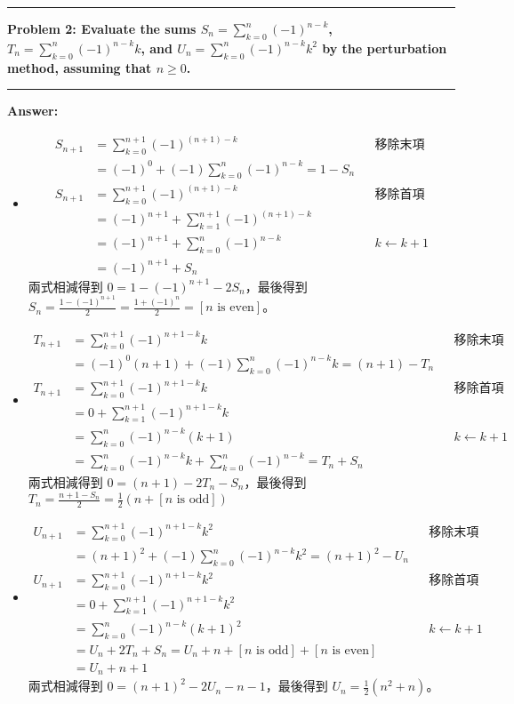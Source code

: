 \documentclass[11pt]{article}
\newcommand\question[2]{\vspace{.25in}\hrule\textbf{#1: #2}\vspace{.5em}\hrule\vspace{.10in}}
\renewcommand\part[1]{\vspace{.10in}\textbf{#1}}
\begin{document}
\question{Problem 2}{Evaluate the sums $S_n = \sum\nolimits_{k=0}^{n}(-1)^{n-k}$, $T_n = \sum\nolimits_{k=0}^{n}(-1)^{n-k} k$, and $U_n = \sum\nolimits_{k=0}^{n}(-1)^{n-k} k^2$ by the perturbation method, assuming that $n \ge 0$.
}

\part{Answer:}

\begin{itemize}
	\item 
		\begin{align*}
		S_{n+1} &= \sum_{k=0}^{n+1}(-1)^{(n+1)-k} && \text{移除末項}\\
				&= (-1)^0 + (-1)\sum_{k=0}^{n}(-1)^{n-k} = 1 - S_n \\
		S_{n+1} &= \sum_{k=0}^{n+1}(-1)^{(n+1)-k} && \text{移除首項}\\
				&= (-1)^{n+1} + \sum_{k=1}^{n+1}(-1)^{(n+1)-k} \\
				&= (-1)^{n+1} + \sum_{k=0}^{n}(-1)^{n-k} && k \leftarrow k+1 \\
				&= (-1)^{n+1} + S_n
		\end{align*}
		兩式相減得到 $0 = 1 - (-1)^{n+1} - 2 S_n$，最後得到 $S_n = \frac{1 - (-1)^{n+1}}{2} = \frac{1 + (-1)^n}{2} = [n \text{ is even}]$。
		
	\item 
		\begin{align*}
		T_{n+1} &= \sum_{k=0}^{n+1} (-1)^{n+1-k} k && \text{移除末項}\\
				&= (-1)^0(n+1) + (-1)\sum_{k=0}^{n} (-1)^{n-k} k = (n+1) - T_n \\
		T_{n+1} &= \sum_{k=0}^{n+1} (-1)^{n+1-k} k && \text{移除首項}\\
				&= 0 + \sum_{k=1}^{n+1} (-1)^{n+1-k} k \\
				&= \sum_{k=0}^{n} (-1)^{n-k} (k+1) && k \leftarrow k+1 \\
				&= \sum_{k=0}^{n} (-1)^{n-k} k + \sum_{k=0}^{n} (-1)^{n-k} = T_n + S_n
		\end{align*}
		兩式相減得到 $0 = (n+1) - 2 T_n - S_n$，最後得到 $T_n = \frac{n+1 - S_n}{2} = \frac{1}{2}(n + [n \text{ is odd}])$
	
	\item
		\begin{align*}
		U_{n+1} &= \sum_{k=0}^{n+1} (-1)^{n+1-k} k^2 && \text{移除末項}\\
				&= (n+1)^2 + (-1)\sum_{k=0}^{n} (-1)^{n-k} k^2 = (n+1)^2 - U_n \\
		U_{n+1} &= \sum_{k=0}^{n+1} (-1)^{n+1-k} k^2 && \text{移除首項}\\
				&= 0 + \sum_{k=1}^{n+1} (-1)^{n+1-k} k^2 \\
				&= \sum_{k=0}^{n} (-1)^{n-k} (k+1)^2 && k \leftarrow k+1 \\
				&= U_n + 2 T_n + S_n = U_n + n + [n \text{ is odd}] + [n \text{ is even}] \\
				&= U_n + n + 1
		\end{align*}
		兩式相減得到 $0 = (n+1)^2 - 2 U_n - n - 1$，最後得到 $U_n = \frac{1}{2} (n^2 + n)$。
\end{itemize}
\end{document}
